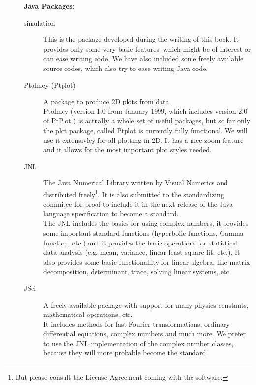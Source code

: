 \begin{description}
\item[] \textbf{Java Packages:}
\begin{description}
\item[simulation] This is the package developed during the writing
        of this book. It provides only some very basic features, which
        might be of interest or can ease writing code. We have also
        included some freely available source codes, which also
        try to ease writing Java code.
\item[Ptolmey (Ptplot)] A package to produce 2D plots from data. \\
        Ptolmey (version 1.0 from January 1999, which includes version
        2.0 of PtPlot.)
        is actually a whole set of useful packages, but so far only the
        plot package, called Ptplot is currently fully functional. We will
        use it extensivley for all plotting in 2D. It has a nice
        zoom feature and it allows for the most important plot styles
        needed.
\item[JNL] The Java Numerical Library written by Visual Numerics and
        distributed freely\footnote{But please consult the License Agreement
        coming with the software.}. It is also submitted to the standardizing
        commitee for proof to include it in the next release of the
        Java language specification to become a standard. \\
        The JNL includes the basics for using complex numbers, it
        provides some important standard functions (hyperbolic
        functions, Gamma function, etc.) and it provides 
        the basic operations for statistical data analysis (e.g. mean,
        variance, linear least square fit, etc.). It also provides some
        basic functionallity for linear algebra, like matrix decomposition,
        determinant, trace, solving linear systems, etc.
\item[JSci] A freely available package with support for many 
  physics constants, mathematical operations, etc. \\
   It includes methods for fast Fourier transformations, ordinary differential 
   equations, complex numbers and much more. We prefer to use the JNL
   implementation of the complex number classes, because they will
   more probable become the standard.
\end{description}

\end{description}



